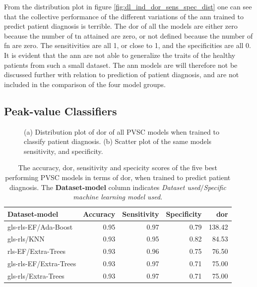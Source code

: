 From the distribution plot in figure \ref{fig:dl_ind_dor_sens_spec_dist} one can see that the collective performance of the different variations of the \acrshort{ann} trained to predict patient diagnosis is terrible. The \acrshort{dor} of all the models are either zero because the number of \acrshort{tn} attained are zero, or not defined because the number of \acrshort{fn} are zero. The sensitivities are all 1, or close to 1, and the specificities are all 0. It is evident that the \acrshort{ann} are not able to generalize the traits of the healthy patients from such a small dataset. The \acrshort{ann} models are will therefore not be discussed further with relation to prediction of patient diagnosis, and are not included in the comparison of the four model groups.

\newpage

\subsection{Peak-value Classifiers}

\begin{figure}[H]
    \centering
    
    \caption{(a) Distribution plot of \acrshort{dor} of all PVSC models when trained to classify patient diagnosis.
             (b) Scatter plot of the same models sensitivity, and specificity.}
    \label{fig:pvmlc_ind_dor_sens_spec_dist}
\end{figure}

\begin{table}
    \centering
    \begin{tabular}{lrrrr}
        \toprule
        Dataset-model          &  Accuracy &  Sensitivity &  Specificity &  \acrshort{dor} \\
        \midrule
        gls-rls-EF/Ada-Boost   &      0.95 &         0.97 &         0.79 & 138.42 \\
        gls-rls/KNN            &      0.93 &         0.95 &         0.82 &  84.53 \\
        rls-EF/Extra-Trees     &      0.93 &         0.96 &         0.75 &  76.50 \\
        gls-rls-EF/Extra-Trees &      0.93 &         0.97 &         0.71 &  75.00 \\
        gls-rls/Extra-Trees    &      0.93 &         0.97 &         0.71 &  75.00 \\
        \bottomrule
    \end{tabular}
    \caption{The accuracy, \acrshort{dor}, sensitivity and specicity scores of the five best performing PVSC models in terms of \acrshort{dor}, when trained to predict patient diagnosis.
             The \textbf{Dataset-model} column indicates \textit{Dataset used}$/$\textit{Specific machine learning model used}.}
    \label{tab:pvsc_hf_dor_sens_spec_dist}
\end{table}

